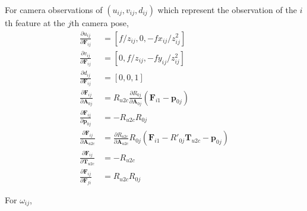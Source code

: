 \documentclass[12pt]{article}   %
\begin{document}
\begin{appendices}
For camera observations of $(u_{ij}, v_{ij}, d_{ij})$ which represent the
observation of the $i$th feature at the $j$th camera pose, 
\begin{align}
\frac{\partial u_{ij}}{\partial \textbf{F}_{ij}} &= [f/z_{ij}, 0, -fx_{ij}/z^2_{ij}] \\
\frac{\partial v_{ij}}{\partial \textbf{F}_{ij}} &= [0, f/z_{ij}, -fy_{ij}/z^2_{ij}] \\
\frac{\partial d_{ij}}{\partial \textbf{F}_{ij}} &= [0, 0, 1] \\
\frac{\partial \textbf{F}_{ij}}{\partial \textbf{A}_{0j}} &= R_{u2c} \frac{\partial R_{0j}}{\partial \textbf{A}_{0j}} (\textbf{F}_{i1} - \textbf{p}_{0j}) \\
\frac{\partial \textbf{F}_{ij}}{\partial \textbf{p}_{0j}} &= -R_{u2c} R_{0j} \\
\frac{\partial \textbf{F}_{ij}}{\partial \textbf{A}_{u2c}} &= \frac{\partial R_{u2c}}{\partial \textbf{A}_{u2c}} R_{0j}(\textbf{F}_{i1} - R'_{0j} \textbf{T}_{u2c} - \textbf{p}_{0j}) \\
\frac{\partial \textbf{F}_{ij}}{\partial \textbf{T}_{u2c}} &= -R_{u2c}\\
\frac{\partial \textbf{F}_{ij}}{\partial \textbf{F}_{fi}} &= R_{u2c} R_{0j} 
\end{align}

For $\omega_{ij}$,


\end{appendices}
\end{document}
